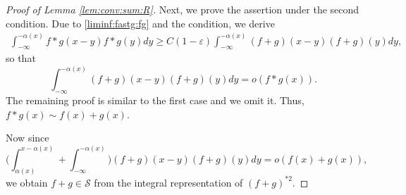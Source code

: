 \documentclass[12pt,leqno]{amsart}
\newcommand{\vep}{\varepsilon}
\newcommand{\cals}{{\mathcal S}}
\newcommand{\1}{{\mathbf 1}}
\begin{document}
\begin{proof}[Proof of Lemma \ref{lem:conv:sum:R}]
Next, we prove the assertion under the second condition. Due to \eqref{liminf:fastg:fg} and 
the condition, we derive 
\begin{align*}
\int_{-\infty}^{-\alpha(x)} f\ast g(x-y) f\ast g(y)dy  \ge C(1-\vep) \int_{-\infty}^{-\alpha(x)} (f+g)(x-y)(f+g)(y)dy, 
\end{align*}
so that 
\[
 \int_{-\infty}^{-\alpha(x)} (f+g)(x-y)(f+g)(y)dy =o(f\ast g(x)). 
\]
The remaining proof is similar to the first case and we omit it. Thus, $f\ast g(x)\sim f(x)+g(x)$.


Now since 
\[
\Big( \int_{\alpha(x)}^{x-\alpha(x)} + \int_{-\infty}^{-\alpha(x)} \Big)  (f+g)(x-y)(f+g)(y)dy = o(f(x)+g(x)),
\]
we obtain $f+g\in \cals$ from the integral representation of $(f+g)^{\ast 2}$.
\end{proof}
\end{document}

